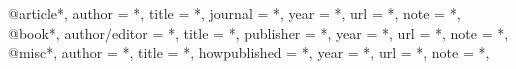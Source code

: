 @article{*, 
	author = 		{*},
	title = 		{*},
	journal = 		{*},
	year =	 		{*},
	url = 			{*},
	note = 			{*},
}
@book{*,
	author/editor = 	{*},
	title =			{*},
	publisher =		{*},
	year =			{*},
	url =		 	{*},
	note = 			{*},
}
@misc{*,
	author = 		{*},
	title = 		{*},
	howpublished =		{*},
	year =			{*},
	url = 			{*},
	note = 			{*},
}

